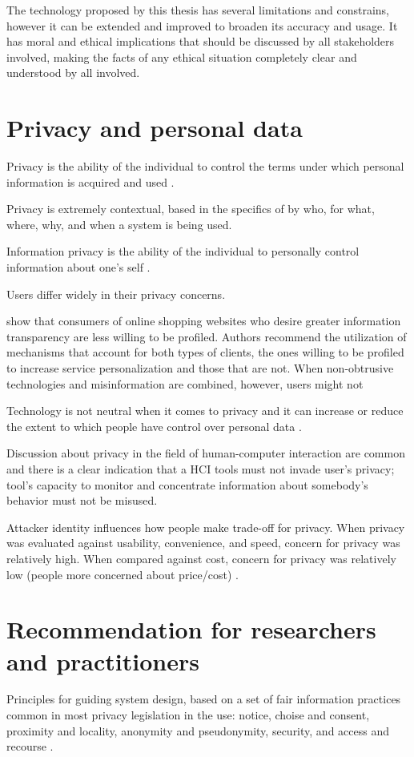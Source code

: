 The technology proposed by this thesis has several limitations and constrains, however it can be extended and improved to broaden its accuracy and usage. It has moral and ethical implications that should be discussed by all stakeholders involved, making the facts of any ethical situation completely clear and understood by all involved.

\section{Privacy and personal data}

Privacy is the ability of the individual to control the terms under which personal information is acquired and used \parencite{culnan2000protecting}.

Privacy is extremely contextual, based in the specifics of by who, for what, where, why, and when a system is being used. \parencite{ackerman2005privacy}

Information privacy is the ability of the individual to personally control information about one's self \parencite{stone1983field}.

Users differ widely in their privacy concerns.\parencite{ackerman2005privacy}

\textcite{awad2006personalization} show that consumers of online shopping websites who desire greater information transparency are less willing to be profiled. Authors recommend the utilization of mechanisms that account for both types of clients, the ones willing to be profiled to increase service personalization and those that are not. When non-obtrusive technologies and misinformation are combined, however, users might not

Technology is not neutral when it comes to privacy and it can increase or reduce the extent to which people have control over personal data \parencite{bellotti1993design}.

Discussion about privacy in the field of human-computer interaction are common and there is a clear indication that a HCI tools must not invade user's privacy; tool's capacity to monitor and concentrate information about somebody's behavior must not be misused. \parencite{pantic2003toward}

Attacker identity influences how people make trade-off for privacy. When privacy was evaluated against usability, convenience, and speed, concern for privacy was relatively high. When compared against cost, concern for privacy was relatively low (people more concerned about price/cost) \parencite{nguyen2016effects}.

\section{Recommendation for researchers and practitioners}

Principles for guiding system design, based on a set of fair information practices common in most privacy legislation in the use: notice, choise and consent, proximity and locality, anonymity and pseudonymity, security, and access and recourse \parencite{langheinrich2001privacy}.

